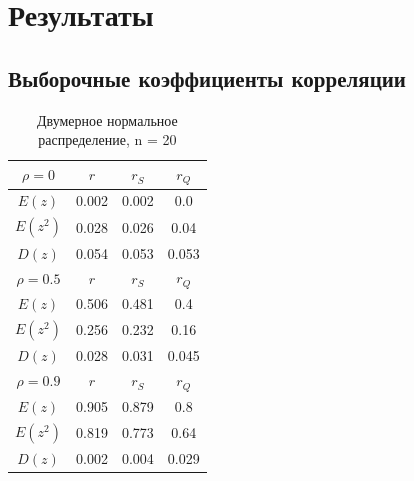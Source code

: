 \documentclass[main.tex]{subfiles}
\begin{document}
\section{Результаты}
\subsection{Выборочные коэффициенты корреляции}
\begin{table}[ht]
	\centering
	\begin{tabular}{| c | c | c | c |}
		
		\hline
		$\rho = 0$ & $r$      & $r_S$  & $r_Q$ \\
		\hline
		$E(z)$    & 0.002 & 0.002 & 0.0   \\
		$E(z^2)$  & 0.028 & 0.026 & 0.04  \\
		$D(z)$    & 0.054 & 0.053 & 0.053 \\
		\hline
		$\rho = 0.5$ & $r$      & $r_S$  & $r_Q$ \\
		\hline
		$E(z)$       & 0.506 & 0.481 & 0.4   \\
		$E(z^2)$    & 0.256 & 0.232 & 0.16  \\
		$D(z)$      & 0.028 & 0.031 & 0.045 \\
		\hline
		$\rho = 0.9$ & $r$      & $r_S$  & $r_Q$ \\
		\hline
		$E(z)$       & 0.905 & 0.879 & 0.8   \\
		$E(z^2)$    & 0.819 & 0.773 & 0.64  \\
		$D(z)$      & 0.002 & 0.004 & 0.029 \\
		\hline
		
	\end{tabular}{}
	\caption{Двумерное нормальное распределение, n = 20}
	\label{tab:n20}
\end{table}
\end{document}
